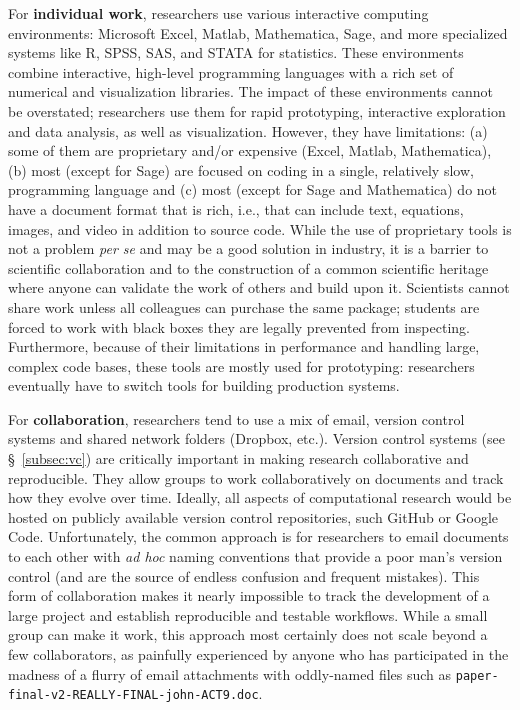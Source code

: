 \documentclass[11pt,oneside,english]{article}
\begin{document}
For \textbf{individual work}, researchers use various interactive computing
environments: Microsoft Excel, Matlab, Mathematica, Sage, and more specialized
systems like R, SPSS, SAS, and STATA for statistics. These environments combine
interactive, high-level programming languages with a rich set of numerical and
visualization libraries. The impact of these environments cannot be overstated;
researchers use them for rapid prototyping, interactive exploration and data
analysis, as well as visualization. However, they have limitations: (a) some of
them are proprietary and/or expensive (Excel, Matlab, Mathematica), (b) most
(except for Sage) are focused on coding in a single, relatively slow,
programming language and (c) most (except for Sage and Mathematica) do not have
a document format that is rich, i.e., that can include text, equations, images,
and video in addition to source code. While the use of proprietary tools is not
a problem \emph{per se} and may be a good solution in industry, it is a barrier
to scientific collaboration and to the construction of a common scientific
heritage where anyone can validate the work of others and build upon it.
Scientists cannot share work unless all colleagues can purchase the same
package; students are forced to work with black boxes they are legally
prevented from inspecting. Furthermore, because of their limitations in
performance and handling large, complex code bases, these tools are mostly used
for prototyping: researchers eventually have to switch tools for building
production systems.

For \textbf{collaboration}, researchers tend to use a mix of email, version
control systems and shared network folders (Dropbox, etc.).  Version control
systems (see §~\ref{subsec:vc}) are critically important in making research
collaborative and reproducible. They allow groups to work collaboratively on
documents and track how they evolve over time. Ideally, all aspects of
computational research would be hosted on publicly available version control
repositories, such GitHub or Google Code. Unfortunately, the common
approach is for researchers to email documents to each other with
\emph{ad hoc} naming conventions that provide a poor man's version
control (and are the source of endless confusion and frequent mistakes). This
form of collaboration makes it nearly impossible to track the development of a
large project and establish reproducible and testable workflows.  While a
small group can make it work, this approach most certainly
does not scale beyond a few collaborators, as painfully experienced by anyone
who has participated in the madness of a flurry of email attachments with
oddly-named files such as {\tt paper-final-v2-REALLY-FINAL-john-ACT9.doc}.
\end{document}
